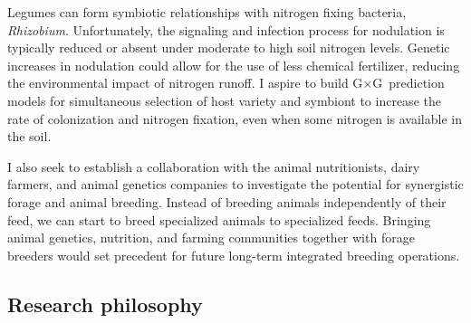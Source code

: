 \documentclass[11pt]{article}
\newcommand{\gxe}{G$\times$E}
\newcommand{\gxg}{G$\times$G}
\begin{document}

Legumes can form symbiotic relationships with nitrogen fixing bacteria, \emph{Rhizobium}. Unfortunately, the signaling and infection process for nodulation is typically reduced or absent under moderate to high soil nitrogen levels. Genetic increases in nodulation could allow for the use of less chemical fertilizer, reducing the environmental impact of nitrogen runoff. I aspire to build \gxg\ prediction models for simultaneous selection of host variety and symbiont to increase the rate of colonization and nitrogen fixation, even when some nitrogen is available in the soil.


I also seek to establish a collaboration with the animal nutritionists, dairy farmers, and animal genetics companies to investigate the potential for synergistic forage and animal breeding. Instead of breeding animals independently of their feed, we can start to breed specialized animals to specialized feeds. Bringing animal genetics, nutrition, and farming communities together with forage breeders would set precedent for future long-term integrated breeding operations.






\subsection*{Research philosophy}
\end{document}
